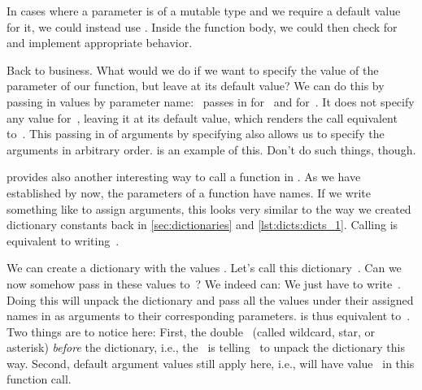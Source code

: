 In cases where a parameter is of a mutable type and we require a default value for it, we could instead use .
Inside the function body, we could then check for  and implement appropriate behavior.

Back to business.
What would we do if we want to specify the value of the parameter  of our function, but leave  at its default value?
We can do this by passing in values by parameter name:
~passes in  for~ and  for~.
It does not specify any value for~, leaving it at its default value, which renders the call equivalent to~.
This passing in of arguments by specifying  also allows us to specify the arguments in arbitrary order.
 is an example of this.
Don't do such things, though.%
%
\begin{sloppypar}%
 provides also another interesting way to call a function in \python.
As we have established by now, the parameters of a function have names.
If we write something like  to assign arguments, this looks very similar to the way we created dictionary constants back in \cref{sec:dictionaries} and \cref{lst:dicts:dicts_1}.
Calling  is equivalent to writing~.%
\end{sloppypar}%
%
We can create a dictionary with the values .
Let's call this dictionary~.
Can we now somehow pass in these values to~?
We indeed can:
We just have to write~.
Doing this will unpack the dictionary  and pass all the values under their assigned names in as arguments to their corresponding parameters.
 is thus equivalent to~.
Two things are to notice here:
First, the double~\pythonil{*} (called %
wildcard, %
star, or %
asterisk) %
\emph{before} the dictionary, i.e., the~\pythonil{**} is telling \python\ to unpack the dictionary this way.
Second, default argument values still apply here, i.e.,  will have value~ in this function call.

